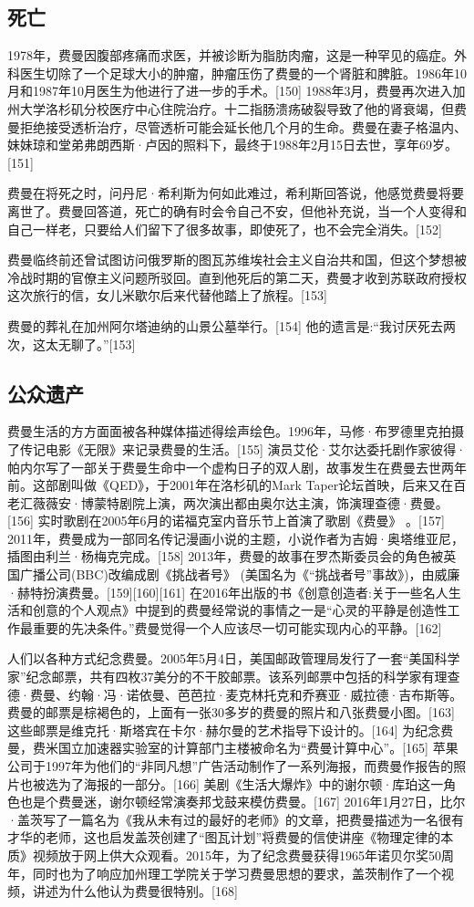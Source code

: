 \subsection{死亡}
1978年，费曼因腹部疼痛而求医，并被诊断为脂肪肉瘤，这是一种罕见的癌症。外科医生切除了一个足球大小的肿瘤，肿瘤压伤了费曼的一个肾脏和脾脏。1986年10月和1987年10月医生为他进行了进一步的手术。[150] 1988年3月，费曼再次进入加州大学洛杉矶分校医疗中心住院治疗。十二指肠溃疡破裂导致了他的肾衰竭，但费曼拒绝接受透析治疗，尽管透析可能会延长他几个月的生命。费曼在妻子格温内、妹妹琼和堂弟弗朗西斯·卢因的照料下，最终于1988年2月15日去世，享年69岁。[151]

费曼在将死之时，问丹尼·希利斯为何如此难过，希利斯回答说，他感觉费曼将要离世了。费曼回答道，死亡的确有时会令自己不安，但他补充说，当一个人变得和自己一样老，只要给人们留下了很多故事，即使死了，也不会完全消失。[152]

费曼临终前还曾试图访问俄罗斯的图瓦苏维埃社会主义自治共和国，但这个梦想被冷战时期的官僚主义问题所驳回。直到他死后的第二天，费曼才收到苏联政府授权这次旅行的信，女儿米歇尔后来代替他踏上了旅程。[153]

费曼的葬礼在加州阿尔塔迪纳的山景公墓举行。[154] 他的遗言是:“我讨厌死去两次，这太无聊了。”[153]

\subsection{公众遗产}
费曼生活的方方面面被各种媒体描述得绘声绘色。1996年，马修·布罗德里克拍摄了传记电影《无限》来记录费曼的生活。[155] 演员艾伦·艾尔达委托剧作家彼得·帕内尔写了一部关于费曼生命中一个虚构日子的双人剧，故事发生在费曼去世两年前。这部剧叫做《QED》，于2001年在洛杉矶的Mark Taper论坛首映，后来又在百老汇薇薇安·博蒙特剧院上演，两次演出都由奥尔达主演，饰演理查德·费曼。[156] 实时歌剧在2005年6月的诺福克室内音乐节上首演了歌剧《费曼》 。[157] 2011年，费曼成为一部同名传记漫画小说的主题，小说作者为吉姆·奥塔维亚尼，插图由利兰·杨梅克完成。[158] 2013年，费曼的故事在罗杰斯委员会的角色被英国广播公司(BBC)改编成剧《挑战者号》 (美国名为《“挑战者号”事故》)，由威廉·赫特扮演费曼。[159][160][161] 在2016年出版的书《创意创造者:关于一些名人生活和创意的个人观点》中提到的费曼经常说的事情之一是“心灵的平静是创造性工作最重要的先决条件。”费曼觉得一个人应该尽一切可能实现内心的平静。[162]

人们以各种方式纪念费曼。2005年5月4日，美国邮政管理局发行了一套“美国科学家”纪念邮票，共有四枚37美分的不干胶邮票。该系列邮票中包括的科学家有理查德·费曼、约翰·冯·诺依曼、芭芭拉·麦克林托克和乔赛亚·威拉德·吉布斯等。费曼的邮票是棕褐色的，上面有一张30多岁的费曼的照片和八张费曼小图。[163] 这些邮票是维克托·斯塔宾在卡尔·赫尔曼的艺术指导下设计的。[164] 为纪念费曼，费米国立加速器实验室的计算部门主楼被命名为“费曼计算中心”。[165] 苹果公司于1997年为他们的“非同凡想”广告活动制作了一系列海报，而费曼作报告的照片也被选为了海报的一部分。[166] 美剧《生活大爆炸》中的谢尔顿·库珀这一角色也是个费曼迷，谢尔顿经常演奏邦戈鼓来模仿费曼。[167] 2016年1月27日，比尔·盖茨写了一篇名为《我从未有过的最好的老师》的文章，把费曼描述为一名很有才华的老师，这也启发盖茨创建了“图瓦计划”将费曼的信使讲座《物理定律的本质》视频放于网上供大众观看。2015年，为了纪念费曼获得1965年诺贝尔奖50周年，同时也为了响应加州理工学院关于学习费曼思想的要求，盖茨制作了一个视频，讲述为什么他认为费曼很特别。[168]

